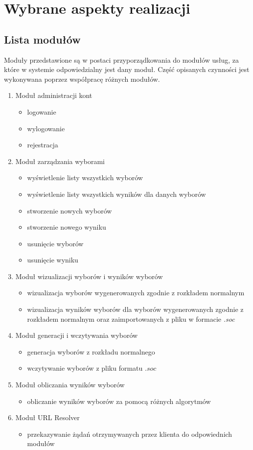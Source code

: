 \documentclass[polish,11pt]{aghthesis}
\begin{document}
\section{Wybrane aspekty realizacji}
\subsection{Lista modułów}
Moduły przedstawione są w postaci przyporządkowania do modułów usług, za które w
systemie odpowiedzialny jest dany moduł. Część opisanych czynności jest wykonywana
poprzez współpracę różnych modułów.

\noindent
\begin{enumerate}[leftmargin=0.5cm]
\item Moduł administracji kont
	\begin{itemize}
	\item logowanie
	\item wylogowanie
	\item rejestracja
	\end{itemize}
\item Moduł zarządzania wyborami
	\begin{itemize}
	\item wyświetlenie listy wszystkich wyborów
	\item wyświetlenie listy wszystkich wyników dla danych wyborów
	\item stworzenie nowych wyborów
	\item stworzenie nowego wyniku
	\item usunięcie wyborów
	\item usunięcie wyniku
	\end{itemize}
\item Moduł wizualizacji wyborów i wyników wyborów
	\begin{itemize}
	\item wizualizacja wyborów wygenerowanych zgodnie z rozkładem normalnym
	\item wizualizacja wyników wyborów dla wyborów wygenerowanych zgodnie z rozkładem
normalnym oraz zaimportowanych z pliku w formacie \textit{.soc}
	\end{itemize}
\item Moduł generacji i wczytywania wyborów
	\begin{itemize}
	\item generacja wyborów z rozkładu normalnego
	\item wczytywanie wyborów z pliku formatu $.soc$
	\end{itemize}
\item Moduł obliczania wyników wyborów
	\begin{itemize}
	\item obliczanie wyników wyborów za pomocą różnych algorytmów
	\end{itemize}
\item Moduł URL Resolver
	\begin{itemize}
	\item przekazywanie żądań otrzymywanych przez klienta do odpowiednich modułów
	\end{itemize}
\end{enumerate}
\end{document}

